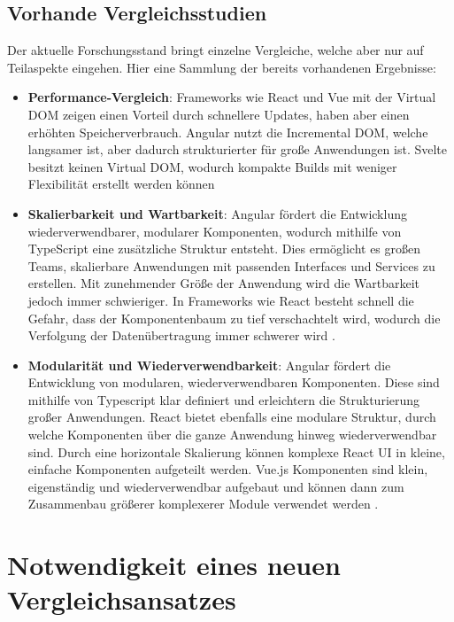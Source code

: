 \documentclass[oneside]{ausarbeitung}
\begin{document}
\subsection{Vorhande Vergleichsstudien}
Der aktuelle Forschungsstand bringt einzelne Vergleiche, welche aber nur auf Teilaspekte eingehen. Hier eine Sammlung der bereits vorhandenen Ergebnisse: 
\begin{itemize}
    \item \textbf{Performance-Vergleich}: Frameworks wie React und Vue mit der Virtual DOM zeigen einen Vorteil durch schnellere Updates, haben aber einen erhöhten Speicherverbrauch. Angular nutzt die Incremental DOM, welche langsamer ist, aber dadurch strukturierter für große Anwendungen ist. Svelte besitzt keinen Virtual DOM, wodurch kompakte Builds mit weniger Flexibilität erstellt werden können \parencite[S.61]{js-framework-comparison}
	\item \textbf{Skalierbarkeit und Wartbarkeit}: Angular fördert die Entwicklung wiederverwendbarer, modularer Komponenten, wodurch mithilfe von TypeScript eine zusätzliche Struktur entsteht. Dies ermöglicht es großen Teams, skalierbare Anwendungen mit passenden Interfaces und Services zu erstellen. Mit zunehmender Größe der Anwendung wird die Wartbarkeit jedoch immer schwieriger. In Frameworks wie React besteht schnell die Gefahr, dass der Komponentenbaum zu tief verschachtelt wird, wodurch die Verfolgung der Datenübertragung immer schwerer wird \parencite[S. 25,28]{comparison-frameworks-scalable-apps}.
    \item \textbf{Modularität und Wiederverwendbarkeit}: Angular fördert die Entwicklung von modularen, wiederverwendbaren Komponenten. Diese sind mithilfe von Typescript klar definiert und erleichtern die Strukturierung großer Anwendungen. React bietet ebenfalls eine modulare Struktur, durch welche Komponenten über die ganze Anwendung hinweg wiederverwendbar sind. Durch eine horizontale Skalierung können komplexe React UI in kleine, einfache Komponenten aufgeteilt werden. Vue.js Komponenten sind klein, eigenständig und wiederverwendbar aufgebaut und können dann zum Zusammenbau größerer komplexerer Module verwendet werden \cite[S. 24,26] {comparison-frameworks-scalable-apps}.
    
\end{itemize}

\section{Notwendigkeit eines neuen Vergleichsansatzes}
\end{document}
